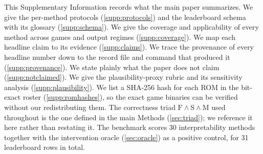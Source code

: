 This Supplementary Information records what the main paper summarizes. We give the
per-method protocols (\Sectionname\ref{supp:protocols}) and the leaderboard schema with its glossary
(\Sectionname\ref{supp:schema}). We give the coverage and applicability of every method across games
and output regimes (\Sectionname\ref{supp:coverage}). We map each headline claim to its evidence
(\Sectionname\ref{supp:claims}). We trace the provenance of every headline number down to the record
file and command that produced it (\Sectionname\ref{supp:provenance}). We state plainly what the
paper does not claim (\Sectionname\ref{supp:notclaimed}). We give the plausibility-proxy rubric and
its sensitivity analysis (\Sectionname\ref{supp:plausibility}). We list a SHA-256 hash for
each ROM in the bit-exact roster (\Sectionname\ref{supp:romhashes}), so the exact game
binaries can be verified without our redistributing them.
The correctness triad $\mathrm{F}\wedge\mathrm{S}\wedge\mathrm{M}$ used throughout is the
one defined in the main Methods (\Sectionname\ref{sec:triad}); we reference it here rather than restating it. The
benchmark scores 30 interpretability methods together with the intervention oracle (\Sectionname\ref{sec:oracle})
as a positive control, for 31 leaderboard rows in total.









